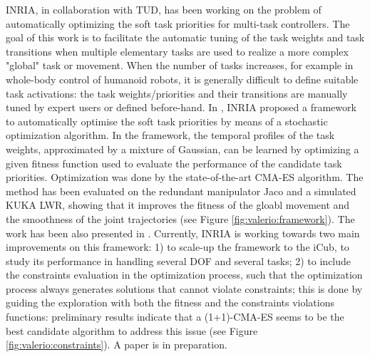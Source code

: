   INRIA, in collaboration with TUD, has been working on the problem of automatically optimizing the soft task priorities for multi-task controllers.
      The goal of this work is to facilitate the automatic tuning of the task weights and task transitions when multiple elementary tasks are used to realize a more complex "global" task or movement.  When the number of tasks increases, for example in whole-body control of humanoid robots, it is generally difficult to define suitable task activations: the task weights/priorities and their transitions are manually tuned by expert users or defined before-hand. In \cite{Modugno2016}, INRIA proposed a framework to automatically optimise the soft task priorities by means of a stochastic optimization algorithm. In the framework, the temporal profiles of the task weights, approximated by a mixture of Gaussian, can be learned by optimizing a given fitness function used to evaluate the performance of the candidate task priorities.  Optimization was done by the state-of-the-art CMA-ES algorithm. The method has been evaluated on the redundant manipulator Jaco and a simulated KUKA LWR, showing that it improves the fitness of the gloabl movement and the smoothness of the joint trajectories (see Figure  \ref{fig:valerio:framework}). The work has been also presented in \cite{Modugno2015hfr}.
Currently, INRIA is working towards two main improvements on this framework: 1) to scale-up the framework to the iCub, to study its performance in handling several DOF and several tasks; 2) to include the constraints evaluation in the optimization process, such that the optimization process always generates solutions that cannot violate constraints; this is done by guiding the exploration with both the fitness and the constraints violations functions: preliminary results indicate that a (1+1)-CMA-ES seems to be the best candidate algorithm to address this issue (see Figure  \ref{fig:valerio:constraints}). A paper is in preparation.

